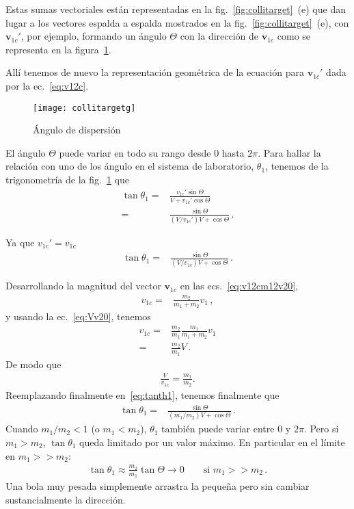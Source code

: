 Estas sumas vectoriales están representadas en la
fig.~\ref{fig:collitarget}~(e) que dan lugar a los vectores espalda a
espalda mostrados en la fig.~\ref{fig:collitarget}~(e), con
$\mathbf{v}_{1c}'$, por ejemplo, formando un ángulo $\Theta$ con la
dirección de $\mathbf{v}_{1c}$ como se representa en la figura~\ref{fig:collitargetg}. 

Allí tenemos de nuevo la representación geométrica de la ecuación para
$\mathbf{v}_{1c}'$ dada por la ec.~\eqref{eq:v12c}.

\begin{frame}
\begin{figure}
  \centering
  \texttt{[image: collitargetg]}
  \caption{Ángulo de dispersión}
  \label{fig:collitargetg}
\end{figure}
\end{frame}

El ángulo $\Theta$ puede variar en todo su rango desde $0$ hasta
$2\pi$. Para hallar la relación con uno de los ángulo en el sistema de
laboratorio, $\theta_1$, tenemos de la trigonometría de la
fig.~\ref{fig:collitargetg} que
\begin{align}
  \tan\theta_1=&\frac{v_{1c}'\sin\Theta}{V+v_{1c}'\cos\Theta}\nonumber\\
  =&\frac{\sin\Theta}{\left(V/v_{1c}'\right)V+\cos\Theta}\,.
\end{align}

Ya que $v_{1c}'=v_{1c}$
\begin{align}
  \label{eq:tanth1}
  \tan\theta_1=&\frac{\sin\Theta}{\left(V/v_{1c}\right)V+\cos\Theta}\,.
\end{align}

Desarrollando la magnitud del vector $\mathbf{v}_{1c}$ en las
ecs.~\eqref{eq:v12cm12v20}, 
\begin{align*}
 v_{1c}=&\frac{m_2}{m_1+m_2}v_1\,, 
 \end{align*}
y usando la ec.~\eqref{eq:Vv20}, tenemos
\begin{align*}
  v_{1c}=&\frac{m_2}{m_1}\frac{m_1}{m_1+m_2}v_1\nonumber\\
  =&\frac{m_2}{m_1}V\,.
\end{align*}
De modo que
\begin{align*}
  \frac{V}{v_{1c}}=\frac{m_1}{m_2}.
\end{align*}
Reemplazando finalmente en~\eqref{eq:tanth1}, tenemos finalmente que
\begin{align*}
    \tan\theta_1=&\frac{\sin\Theta}{\left(m_1/m_2\right)V+\cos\Theta}\,.
\end{align*}
Cuando $m_1/m_2<1$ (o $m_1<m_2$), $\theta_1$ también puede variar entre $0$ y
$2\pi$. Pero si $m_1>m_2$, $\tan\theta_1$ queda limitado por un valor
máximo. En particular en el límite en $m_1>>m_2$:
\begin{align*}
  \tan\theta_1\approx \frac{m_2}{m_1}\tan\Theta\to 0\qquad\text{si $m_1>>m_2$}\,.
\end{align*}
Una bola muy pesada simplemente arrastra la pequeña pero sin cambiar
sustancialmente la dirección.





